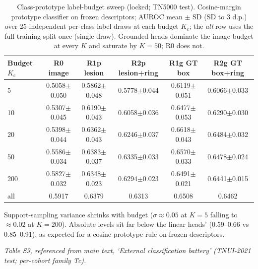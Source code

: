 \documentclass[11pt]{article}
\begin{document}
\begin{table}[!ht]
\centering\small
\caption{Class-prototype label-budget sweep (locked; TN5000 test).
Cosine-margin prototype classifier on frozen descriptors; AUROC mean $\pm$
SD (SD to 3 d.p.) over 25 independent per-class label draws at each budget
$K_c$; the \emph{all} row uses the full training split once (single draw).
Grounded heads dominate the image budget at every $K$ and saturate by
$K{=}50$; R0 does not.}
\label{tab:protosweep}
\begin{tabular}{lccccc}
\toprule
Budget $K_c$ & R0 image & R1p lesion & R2p lesion+ring & R1g GT box & R2g GT box+ring \\
\midrule
5   & 0.5058$\pm$0.050 & 0.5862$\pm$0.048 & 0.5778$\pm$0.044 & 0.6119$\pm$0.051 & 0.6066$\pm$0.033 \\
10  & 0.5307$\pm$0.045 & 0.6190$\pm$0.043 & 0.6058$\pm$0.036 & 0.6477$\pm$0.053 & 0.6290$\pm$0.030 \\
20  & 0.5398$\pm$0.044 & 0.6362$\pm$0.043 & 0.6246$\pm$0.037 & 0.6618$\pm$0.043 & 0.6484$\pm$0.032 \\
50  & 0.5586$\pm$0.034 & 0.6383$\pm$0.037 & 0.6335$\pm$0.033 & 0.6570$\pm$0.033 & 0.6478$\pm$0.024 \\
200 & 0.5827$\pm$0.032 & 0.6348$\pm$0.023 & 0.6294$\pm$0.023 & 0.6491$\pm$0.021 & 0.6441$\pm$0.015 \\
all & 0.5917 & 0.6379 & 0.6313 & 0.6508 & 0.6462 \\
\bottomrule
\end{tabular}
\par\smallskip
{\footnotesize Support-sampling variance shrinks with budget
($\sigma \approx 0.05$ at $K{=}5$ falling to $\approx 0.02$ at
$K{=}200$). Absolute levels sit far below the linear heads'
(0.59--0.66 vs 0.85--0.91), as expected for a cosine prototype
rule on frozen descriptors.}
\end{table}

\noindent\emph{Table S9, referenced from main text, `External classification battery' (TNUI-2021 test; per-cohort family Tc).}
\end{document}

